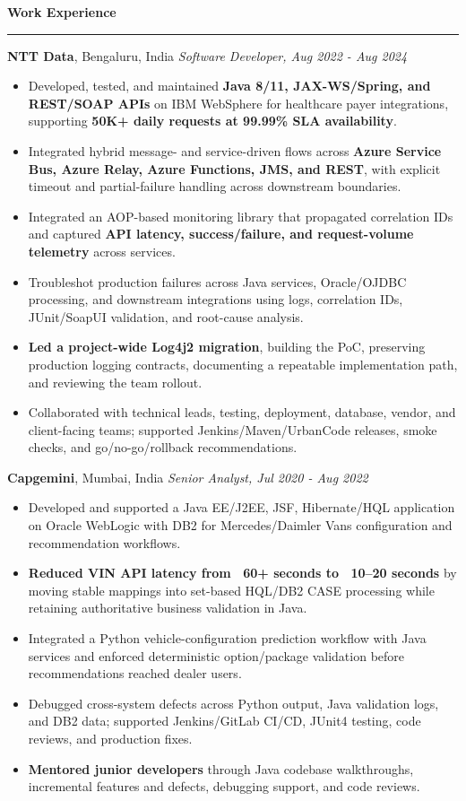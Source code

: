 \documentclass[11pt,letterpaper]{article}
\newcommand{\ressection}[1]{\Needspace{5\baselineskip}\vspace{8pt}\par\textbf{#1}\par\vspace{2pt}\hrule\vspace{5pt}}
\begin{document}
\ressection{Work Experience}
\textbf{NTT Data}, Bengaluru, India \hfill \textit{Software Developer, Aug 2022 - Aug 2024}
\begin{itemize}
  \item Developed, tested, and maintained \textbf{Java 8/11, JAX-WS/Spring, and REST/SOAP APIs} on IBM WebSphere for healthcare payer integrations, supporting \textbf{50K+ daily requests at 99.99\% SLA availability}.
  \item Integrated hybrid message- and service-driven flows across \textbf{Azure Service Bus, Azure Relay, Azure Functions, JMS, and REST}, with explicit timeout and partial-failure handling across downstream boundaries.
  \item Integrated an AOP-based monitoring library that propagated correlation IDs and captured \textbf{API latency, success/failure, and request-volume telemetry} across services.
  \item Troubleshot production failures across Java services, Oracle/OJDBC processing, and downstream integrations using logs, correlation IDs, JUnit/SoapUI validation, and root-cause analysis.
  \item \textbf{Led a project-wide Log4j2 migration}, building the PoC, preserving production logging contracts, documenting a repeatable implementation path, and reviewing the team rollout.
  \item Collaborated with technical leads, testing, deployment, database, vendor, and client-facing teams; supported Jenkins/Maven/UrbanCode releases, smoke checks, and go/no-go/rollback recommendations.
\end{itemize}
\textbf{Capgemini}, Mumbai, India \hfill \textit{Senior Analyst, Jul 2020 - Aug 2022}
\begin{itemize}
  \item Developed and supported a Java EE/J2EE, JSF, Hibernate/HQL application on Oracle WebLogic with DB2 for Mercedes/Daimler Vans configuration and recommendation workflows.
  \item \textbf{Reduced VIN API latency from ~60+ seconds to ~10--20 seconds} by moving stable mappings into set-based HQL/DB2 CASE processing while retaining authoritative business validation in Java.
  \item Integrated a Python vehicle-configuration prediction workflow with Java services and enforced deterministic option/package validation before recommendations reached dealer users.
  \item Debugged cross-system defects across Python output, Java validation logs, and DB2 data; supported Jenkins/GitLab CI/CD, JUnit4 testing, code reviews, and production fixes.
  \item \textbf{Mentored junior developers} through Java codebase walkthroughs, incremental features and defects, debugging support, and code reviews.
\end{itemize}
\end{document}
